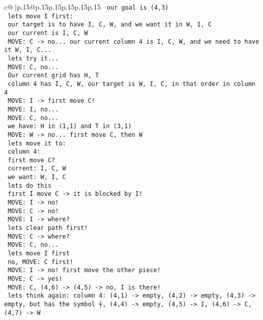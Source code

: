 \documentclass{article}
\begin{document}
{\begin{supertabular}{c@{$\;$}|p{.15\linewidth}@{}p{.15\linewidth}p{.15\linewidth}p{.15\linewidth}p{.15\linewidth}p{.15\linewidth}}
{{{\texttt{ our goal is (4,3) } \\
\texttt{ lets move I first: } \\
\texttt{  our target is to have I, C, W, and we want it in W, I, C } \\
\texttt{ our current is I, C, W} \\
\texttt{ MOVE: C {-}> no... our current column 4 is I, C, W, and we need to have it W, I, C...} \\
\texttt{ lets try it...} \\
\texttt{ MOVE: C, no... } \\
\texttt{  Our current grid has H, T } \\
\texttt{ column 4 has I, C, W, our target is W, I, C, in that order in column 4 } \\
\texttt{ MOVE: I {-}> first move C!} \\
\texttt{ MOVE: I, no...} \\
\texttt{ MOVE: C, no...} \\
\texttt{ we have: H in (1,1) and T in (3,1) } \\
\texttt{ MOVE: W {-}> no... first move C, then W} \\
\texttt{ lets move it to: } \\
\texttt{ column 4: } \\
\texttt{ first move C?} \\
\texttt{ current: I, C, W } \\
\texttt{ we want: W, I, C } \\
\texttt{ lets do this } \\
\texttt{ first I move C {-}> it is blocked by I!} \\
\texttt{ MOVE: I {-}> no! } \\
\texttt{ MOVE: C {-}> no! } \\
\texttt{ MOVE: I {-}> where? } \\
\texttt{ lets clear path first!} \\
\texttt{ MOVE: C {-}> where? } \\
\texttt{ MOVE: C, no... } \\
\texttt{ lets move I first } \\
\texttt{ no, MOVE: C first!} \\
\texttt{ MOVE: I {-}> no! first move the other piece!} \\
\texttt{ MOVE: C {-}> yes!} \\
\texttt{ MOVE: C, (4,6) {-}> (4,5) {-}> no, I is there!} \\
\texttt{ lets think again: column 4: (4,1) {-}> empty, (4,2) {-}> empty, (4,3) {-}> empty, but has the symbol ┼, (4,4) {-}> empty, (4,5) {-}> I, (4,6) {-}> C, (4,7) {-}> W} \\
}}}
\end{supertabular}}
\end{document}

